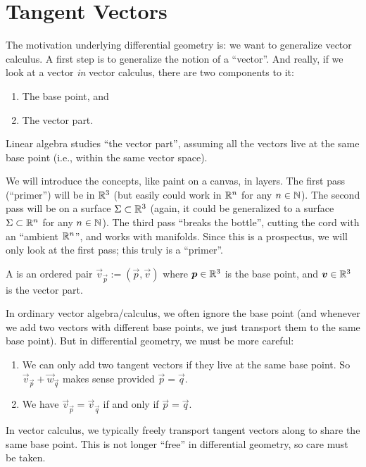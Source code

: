 \section{Tangent Vectors}

\M The motivation underlying differential geometry is: we want to
generalize vector calculus. A first step is to generalize the notion of
a ``vector''. And really, if we look at a vector \emph{in} vector
calculus, there are two components to it:
\begin{enumerate}
\item The base point, and
\item The vector part.
\end{enumerate}
Linear algebra studies ``the vector part'', assuming all the vectors
live at the same base point (i.e., within the same vector space).

\begin{remark}
We will introduce the concepts, like paint on a canvas, in layers. The
first pass (``primer'') will be in $\mathbb{R}^{3}$ (but easily could work in
$\mathbb{R}^{n}$ for any $n\in\mathbb{N}$). The second pass will be on a surface
$\Sigma\subset\mathbb{R}^{3}$ (again, it could be generalized to a surface
$\Sigma\subset\mathbb{R}^{n}$ for any $n\in\mathbb{N}$). The third pass ``breaks the bottle'',
cutting the cord with an ``ambient $\mathbb{R}^{n}$'', and works with
manifolds. Since this is a prospectus, we will only look at the first
pass; this truly is a ``primer''.
\end{remark}

\begin{definition}
A  is an ordered pair $\vec{v}_{\vec{p}}:=(\vec{p}, \vec{v})$
where $\boldsymbol{p}\in\mathbb{R}^{3}$ is the base point, and $\boldsymbol{v}\in\mathbb{R}^{3}$ is the
vector part.
\end{definition}

\begin{remark}
  In ordinary vector algebra/calculus, we often ignore the base point
  (and whenever we add two vectors with different base points, we just
  transport them to the same base point). But in differential geometry,
  we must be more careful:
  \begin{enumerate}
  \item We can only add two tangent vectors if they live at the same base
point. So $\vec{v}_{\vec{p}}+\vec{w}_{\vec{q}}$ makes sense
provided $\vec{p}=\vec{q}$.
\item We have $\vec{v}_{\vec{p}} = \vec{v}_{\vec{q}}$ if and only if 
$\vec{p}=\vec{q}$.
  \end{enumerate}
In vector calculus, we typically freely
transport tangent vectors along to share the same base point. This is
not longer ``free'' in differential geometry, so care must be taken.
\end{remark}

